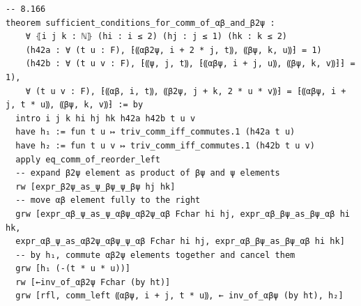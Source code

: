 \begin{Verbatim}
-- 8.166
theorem sufficient_conditions_for_comm_of_αβ_and_β2ψ :
    ∀ ⦃i j k : ℕ⦄ (hi : i ≤ 2) (hj : j ≤ 1) (hk : k ≤ 2)
    (h42a : ∀ (t u : F), ⁅⸨αβ2ψ, i + 2 * j, t⸩, ⸨βψ, k, u⸩⁆ = 1)
    (h42b : ∀ (t u v : F), ⁅⸨ψ, j, t⸩, ⁅⸨αβψ, i + j, u⸩, ⸨βψ, k, v⸩⁆⁆ = 1),
    ∀ (t u v : F), ⁅⸨αβ, i, t⸩, ⸨β2ψ, j + k, 2 * u * v⸩⁆ = ⁅⸨αβψ, i + j, t * u⸩, ⸨βψ, k, v⸩⁆ := by
  intro i j k hi hj hk h42a h42b t u v
  have h₁ := fun t u ↦ triv_comm_iff_commutes.1 (h42a t u)
  have h₂ := fun t u v ↦ triv_comm_iff_commutes.1 (h42b t u v)
  apply eq_comm_of_reorder_left
  -- expand β2ψ element as product of βψ and ψ elements
  rw [expr_β2ψ_as_ψ_βψ_ψ_βψ hj hk]
  -- move αβ element fully to the right
  grw [expr_αβ_ψ_as_ψ_αβψ_αβ2ψ_αβ Fchar hi hj, expr_αβ_βψ_as_βψ_αβ hi hk,
  expr_αβ_ψ_as_αβ2ψ_αβψ_ψ_αβ Fchar hi hj, expr_αβ_βψ_as_βψ_αβ hi hk]
  -- by h₁, commute αβ2ψ elements together and cancel them
  grw [h₁ (-(t * u * u))]
  rw [←inv_of_αβ2ψ Fchar (by ht)]
  grw [rfl, comm_left ⸨αβψ, i + j, t * u⸩, ← inv_of_αβψ (by ht), h₂]


\end{Verbatim}
